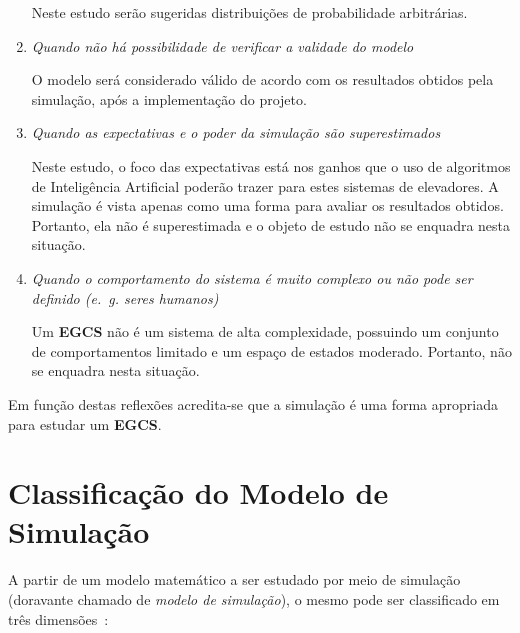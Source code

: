 \begin{enumerate}
Neste estudo serão sugeridas distribuições de probabilidade arbitrárias.

\item \textit{Quando não há possibilidade de verificar a validade do modelo}

O modelo será considerado válido de acordo com os resultados obtidos pela
simulação, após a implementação do projeto.

\item \textit{Quando as expectativas e o poder da simulação são superestimados}

Neste estudo, o foco das expectativas está nos ganhos que o uso de algoritmos de
Inteligência Artificial poderão trazer para estes sistemas de elevadores. A
simulação é vista apenas como uma forma para avaliar os resultados obtidos.
Portanto, ela não é superestimada e o objeto de estudo não se enquadra nesta
situação.

\item \textit{Quando o comportamento do sistema é muito complexo ou não pode ser
definido (e.~g. seres humanos)}

Um \textbf{EGCS} não é um sistema de alta complexidade, possuindo um conjunto de
comportamentos limitado e um espaço de estados moderado. Portanto, não se
enquadra nesta situação.

\end{enumerate}

Em função destas reflexões acredita-se que a simulação é uma forma apropriada
para estudar um \textbf{EGCS}.

\section{Classificação do Modelo de Simulação}

A partir de um modelo matemático a ser estudado por meio de simulação (doravante
chamado de \textit{modelo de simulação}), o mesmo pode ser classificado em três
dimensões~\cite{Banks,Law}:

